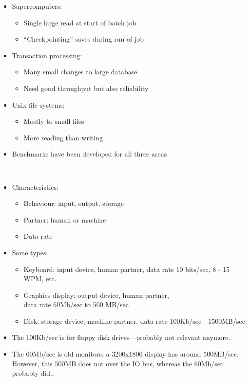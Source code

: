 \begin{frame}[fragile]
\begin{itemize}
\item Supercomputers: 
\begin{itemize}
\item Single large read at start of batch job
\item ``Checkpointing'' saves during run of job
\end{itemize}
\item Transaction processing: 
\begin{itemize}
\item Many small changes to large database
\item Need good throughput but also reliability
\end{itemize}
\item Unix file systems:
\begin{itemize}
\item Mostly to small files
\item More reading than writing
\end{itemize}
\item Benchmarks have been developed for all three areas
\end{itemize}
\BNotes\ifnum{}
~%
\fi\ENotes
\end{frame}

\begin{frame}[fragile]
\begin{itemize}
\item Characteristics:
\begin{itemize}
\item Behaviour: input, output, storage
\item Partner: human or machine
\item Data rate
\end{itemize}
\item Some types:
\begin{itemize}
\item Keyboard: input device, human partner, data rate 10 bits/sec, 8 - 15 WPM, etc.
\item Graphics display: output device, human partner, \\data rate 60Mb/sec to 500
MB/sec
\item Disk: storage device, machine partner, data rate 100Kb/sec---1500MB/sec
\end{itemize}
\end{itemize}
\BNotes\ifnum{}
\begin{itemize}
	\item The 100Kb/sec is for floppy disk drives---probably not relevant
		anymore.
    \item The 60Mb/sec is old monitors; a 3200x1800 display has around
		500MB/sec.  However, this 500MB does not over the IO bus, whereas
		the 60Mb/sec probably did..
\end{itemize}
\fi\ENotes
\end{frame}

